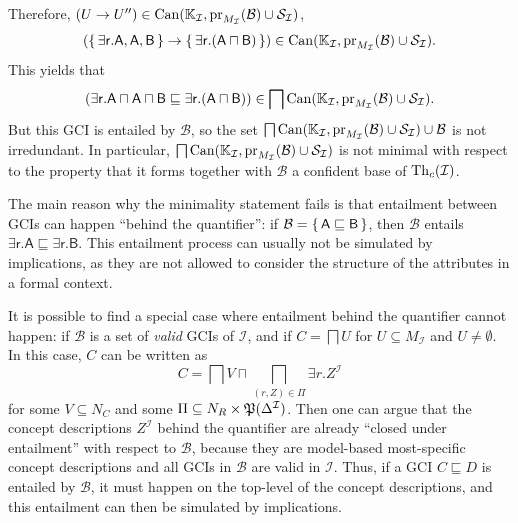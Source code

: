 \begin{Example}
  Therefore, $(U \to U'') \in \operatorname{Can}({\mathbb{K}}_{\mathcal{I}},
  \operatorname{pr}_{M_{\mathcal{I}}}(\mathcal{B}) \cup \mathcal{S}_{\mathcal{I}})$, \ie
  \begin{equation*}
    ({\{\, \mathsf{\exists r. A}, \mathsf{A}, \mathsf{B} \,\}} \to {\ensuremath{\{\, \mathsf{\exists r. (A
        \sqcap B)} \,\}}}) \in \operatorname{Can}({\mathbb{K}}_{\mathcal{I}}, \operatorname{pr}_{M_{\mathcal{I}}}(\mathcal{B}) \cup
    \mathcal{S}_{\mathcal{I}}).
  \end{equation*}
  This yields that
  \begin{equation*}
    (\mathsf{\exists r. A \sqcap A \sqcap B} \sqsubseteq \mathsf{\exists r. (A \sqcap B)})
    \in \bigsqcap \operatorname{Can}({\mathbb{K}}_{\mathcal{I}}, \operatorname{pr}_{M_{\mathcal{I}}}(\mathcal{B}) \cup \mathcal{S}_{\mathcal{I}}).
  \end{equation*}
  But this GCI is entailed by $\mathcal{B}$, so the set $\bigsqcap \operatorname{Can}({\mathbb{K}}_{\mathcal{I}}, \operatorname{pr}_{M_{\mathcal{I}}}(\mathcal{B}) \cup \mathcal{S}_{\mathcal{I}}) \cup
  \mathcal{B}$ is not irredundant.  In particular, $\bigsqcap \operatorname{Can}({\mathbb{K}}_{\mathcal{I}},
  \operatorname{pr}_{M_{\mathcal{I}}}(\mathcal{B}) \cup \mathcal{S}_{\mathcal{I}})$ is not minimal with
  respect to the property that it forms together with $\mathcal{B}$ a confident base of
  $\operatorname{Th}_c(\mathcal{I})$.
\end{Example}

The main reason why the minimality statement fails is that entailment between GCIs can
happen \enquote{behind the quantifier}: if $\mathcal{B} = {\{\, \mathsf{A} \sqsubseteq
  \mathsf{B} \,\}}$, then $\mathcal{B}$ entails $\mathsf{\exists r. A} \sqsubseteq
\mathsf{\exists r. B}$.  This entailment process can usually not be simulated by
implications, as they are not allowed to consider the structure of the attributes in a
formal context.

It is possible to find a special case where entailment behind the quantifier cannot
happen: if $\mathcal{B}$ is a set of \emph{valid} GCIs of $\mathcal{I}$, and if $C =
\bigsqcap U$ for $U \subseteq M_{\mathcal{I}}$ and $U \neq \emptyset$.  In this case, $C$
can be written as
\begin{equation*}
  C = \bigsqcap V \sqcap \bigsqcap_{(r, Z) \in \Pi} \exists r. Z^{\mathcal{I}}
\end{equation*}
for some $V \subseteq N_C$ and some $\Pi \subseteq N_R \times
{\ensuremath{\mathfrak{P}(\Delta^{\mathcal{I}})}}$.  Then one can argue that the concept descriptions
$Z^{\mathcal{I}}$ behind the quantifier are already \enquote{closed under entailment} with
respect to $\mathcal{B}$, because they are model-based most-specific concept descriptions
and all GCIs in $\mathcal{B}$ are valid in $\mathcal{I}$.  Thus, if a GCI $C \sqsubseteq
D$ is entailed by $\mathcal{B}$, it must happen on the top-level of the concept
descriptions, and this entailment can then be simulated by implications.

